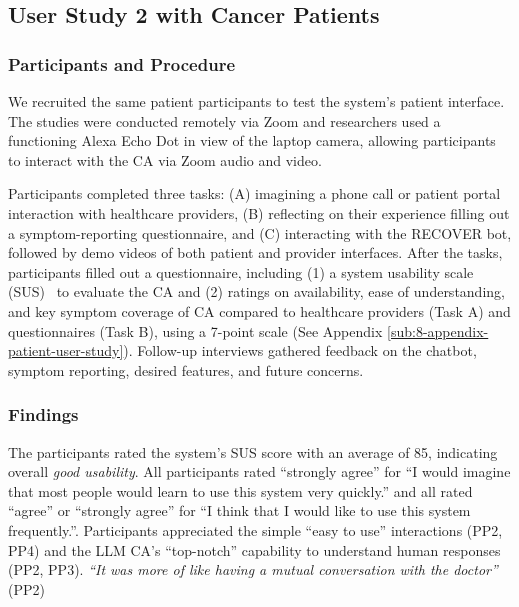 \subsection{User Study 2 with Cancer Patients}

\subsubsection{Participants and Procedure}

We recruited the same patient participants to test the \projectname{} system's patient interface. The studies were conducted remotely via Zoom and researchers used a functioning Alexa Echo Dot in view of the laptop camera, allowing participants to interact with the CA via Zoom audio and video.

Participants completed three tasks: (A) imagining a phone call or patient portal interaction with healthcare providers, (B) reflecting on their experience filling out a symptom-reporting questionnaire, and (C) interacting with the RECOVER bot, followed by demo videos of both patient and provider interfaces.
After the tasks, participants filled out a questionnaire, including (1) a system usability scale (SUS)~\cite{bangor2008empirical, lewis2018system} to evaluate the \projectname{} CA and (2) ratings on availability, ease of understanding, and key symptom coverage of \projectname{} CA compared to healthcare providers (Task A) and questionnaires (Task B), using a 7-point scale (See Appendix \ref{sub:8-appendix-patient-user-study}). Follow-up interviews gathered feedback on the chatbot, symptom reporting, desired features, and future concerns.

\subsubsection{Findings}
The participants rated the system's SUS score with an average of 85, indicating overall \textit{good usability}. All participants rated ``strongly agree'' for ``I would imagine that most people would learn to use this system very quickly.'' and all rated ``agree'' or ``strongly agree'' for ``I think that I would like to use this system frequently.''.
Participants appreciated the simple ``easy to use'' interactions (PP2, PP4) and the LLM CA's ``top-notch'' capability to understand human responses (PP2, PP3). \textit{``It was more of like having a mutual conversation with the doctor'' }(PP2) 

